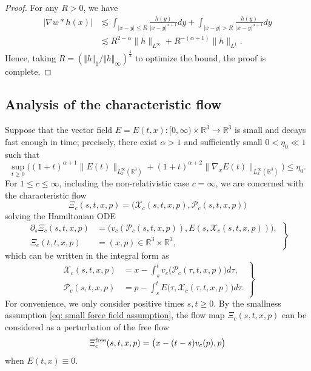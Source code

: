\documentclass[reqno, 11pt, letterpaper]{amsart}
\theoremstyle{remark}
\numberwithin{equation}{section}
\numberwithin{theorem}{section}
\numberwithin{table}{section}
\numberwithin{figure}{section}
\begin{document}
\begin{proof}
For any $R>0$, we have
$$\begin{aligned}
|\nabla w*h(x)|&\lesssim\int_{|x-y|\leq R} \frac{h(y)}{|x-y|^{\alpha+1}}dy +\int_{|x-y|>R} \frac{h(y)}{|x-y|^{\alpha+1}}dy\\
&\lesssim R^{2-\alpha}\|h\|_{L^\infty}+R^{-(\alpha+1)}\|h\|_{L^1}.
\end{aligned}$$
Hence, taking $R = \left (\Vert h \Vert_1 / \Vert h \Vert_\infty \right )^\frac{1}{3}$ to optimize the bound, the proof is complete.
\end{proof}


\subsection{Analysis of the characteristic flow}

Suppose that the vector field $E=E(t,x): [0,\infty) \times \mathbb{R}^3\to\mathbb{R}^3$ is small and decays fast enough in time; precisely, there exist $\alpha>1$ and sufficiently small $0<\eta_0 \ll 1$ such that 
\begin{equation}\label{eq: small force field assumption}
\sup_{t\geq0}\Big((1+t)^{\alpha+1}\|E(t)\|_{L_x^\infty(\mathbb{R}^3)}+(1+t)^{\alpha+2}\|\nabla _xE(t)\|_{L_x^\infty(\mathbb{R}^3)}\Big)\leq\eta_0.
\end{equation}
For $1\leq c\leq\infty$, including the non-relativistic case $c=\infty$, we are concerned with the characteristic flow
$$\Xi_c(s,t,x,p)=\big(\mathcal{X}_c(s,t,x,p), \mathcal{P}_c(s,t,x,p)\big)$$
solving the Hamiltonian ODE
\begin{equation}\label{eq: r-ODE}
\left.
\begin{aligned}
\partial_s\Xi_c(s,t,x,p)&=\big(v_c(\mathcal{P}_c(s,t,x,p)), E(s,\mathcal{X}_c(s,t,x,p))\big),\\
\Xi_c(t,t,x,p)&=(x,p)\in\mathbb{R}^3\times\mathbb{R}^3,
\end{aligned}
\right \}
\end{equation}
which can be written in the integral form as
\begin{equation}\label{eq: integral r-ODE}
\left. \begin{aligned}
\mathcal{X}_c(s,t,x,p)&=x-\int_s^t v_c\big(\mathcal{P}_c(\tau,t,x,p)\big) d\tau,\\
\mathcal{P}_c(s,t,x,p)&=p-\int_s^tE\big(\tau,\mathcal{X}_c(\tau,t,x,p)\big)d\tau.
\end{aligned}\right \}
\end{equation}
For convenience, we only consider positive times $s,t\geq0$. By the smallness assumption \eqref{eq: small force field assumption}, the flow map $\Xi_c(s,t,x,p)$ can be considered as a perturbation of the free flow 
$$\Xi_c^{\textup{free}}(s,t,x,p)=\big(x-(t-s)v_c(p),p\big)$$
when $E(t,x)\equiv 0$. 
\end{document}
